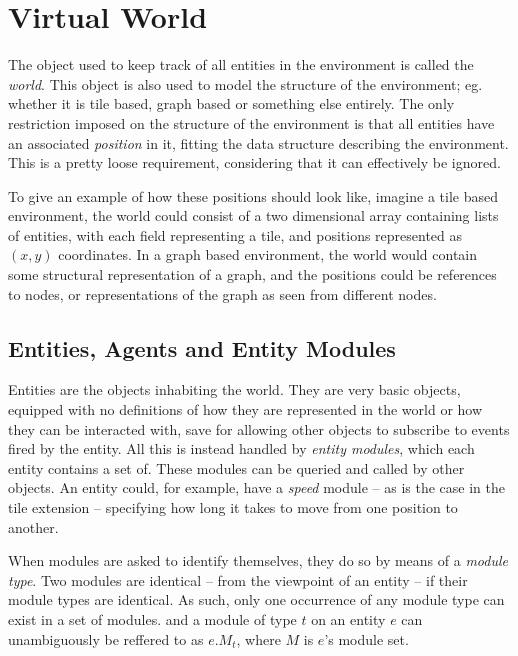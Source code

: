 
\section{Virtual World\label{sec:SystemFeaturesVirtualWorld}}

The object used to keep track of all entities in the environment is
called the \emph{world}. This object is also used to model the structure
of the environment; eg. whether it is tile based, graph based or something
else entirely. The only restriction imposed on the structure of the
environment is that all entities have an associated \emph{position}
in it, fitting the data structure describing the environment. This
is a pretty loose requirement, considering that it can effectively
be ignored.

To give an example of how these positions should look like, imagine
a tile based environment, the world could consist of a two dimensional
array containing lists of entities, with each field representing a
tile, and positions represented as $(x,y)$ coordinates. In a graph
based environment, the world would contain some structural representation
of a graph, and the positions could be references to nodes, or representations
of the graph as seen from different nodes.


\subsection{Entities, Agents and Entity Modules\label{sub:SysFeatEntities}}

Entities are the objects inhabiting the world. They are very basic
objects, equipped with no definitions of how they are represented
in the world or how they can be interacted with, save for allowing
other objects to subscribe to events fired by the entity. All this
is instead handled by \emph{entity modules}, which each entity contains
a set of. These modules can be queried and called by other objects.
An entity could, for example, have a \emph{speed} module -- as is
the case in the tile extension -- specifying how long it takes to
move from one position to another.

When modules are asked to identify themselves, they do so by means
of a \emph{module type}. Two modules are identical -- from the viewpoint
of an entity -- if their module types are identical. As such, only
one occurrence of any module type can exist in a set of modules. and
a module of type $t$ on an entity $e$ can unambiguously be reffered
to as $e.M_{t}$, where $M$ is $e$'s module set. 

